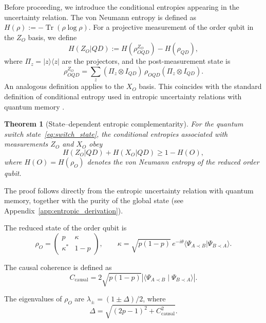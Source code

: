 \documentclass[aps,pra,reprint,superscriptaddress]{revtex4-2}
\newtheorem{theorem}{Theorem}[section]
\begin{document}
Before proceeding, we introduce the conditional entropies appearing in the uncertainty relation. The von Neumann entropy is defined as $H(\rho) := -\operatorname{Tr}(\rho \log \rho)$. For a projective measurement of the order qubit in the $Z_O$ basis, we define
\begin{equation}
H(Z_O|QD) := H(\rho^{Z_O}_{OQD}) - H(\rho_{QD}),
\end{equation}
where $\Pi_z = |z\rangle\langle z|$ are the projectors, and the post-measurement state is
\begin{equation}
\rho^{Z_O}_{OQD}
= \sum_{z}
(\Pi_z \otimes I_{QD}) \,
\rho_{OQD}
(\Pi_z \otimes I_{QD}).
\end{equation}
An analogous definition applies to the $X_O$ basis. This coincides with the standard definition of conditional entropy used in entropic uncertainty relations with quantum memory \cite{Berta2010}.
\begin{theorem}[State--dependent entropic complementarity]
For the quantum switch state~\eqref{eq:switch_state}, the conditional entropies associated with measurements $Z_O$ and $X_O$ obey
\begin{equation}
H(Z_O|QD) + H(X_O|QD) \ge 1 - H(O),
\label{eq:state_dependent_bound}
\end{equation}
where $H(O) = H(\rho_O)$ denotes the von Neumann entropy of the reduced order qubit.
\end{theorem}

The proof follows directly from the entropic uncertainty relation with quantum memory, together with the purity of the global state (see Appendix~\ref{app:entropic_derivation}).

\medskip

The reduced state of the order qubit is
\begin{equation}
\rho_O =
\begin{pmatrix}
p & \kappa \\
\kappa^* & 1-p
\end{pmatrix},
\qquad
\kappa = \sqrt{p(1-p)}\,e^{-i\theta}
\langle \Psi_{A\prec B} | \Psi_{B\prec A} \rangle .
\end{equation}

The causal coherence is defined as
\begin{equation}
C_{\mathrm{causal}} = 2\sqrt{p(1-p)}
\left|\langle \Psi_{A\prec B} \mid \Psi_{B\prec A} \rangle\right|.
\end{equation}

The eigenvalues of $\rho_O$ are $\lambda_\pm = (1 \pm \Delta)/2$, where
\begin{equation}
\Delta = \sqrt{(2p-1)^2 + C_{\mathrm{causal}}^2}.
\end{equation}
\end{document}
